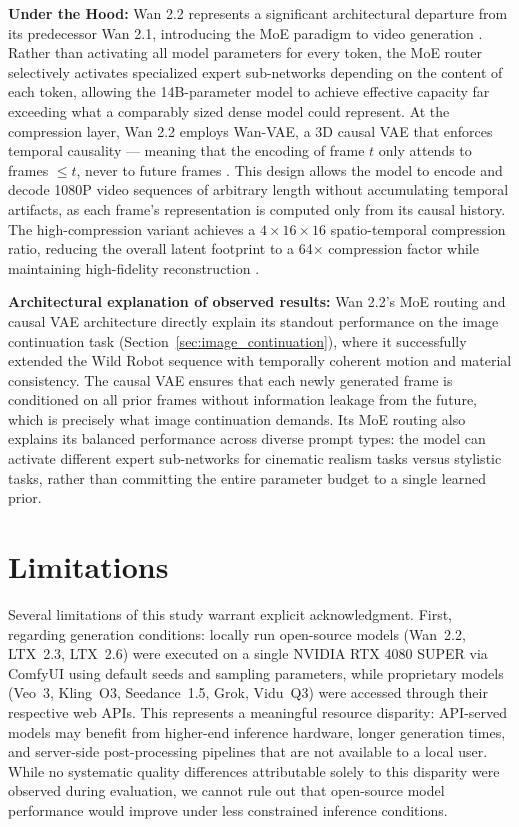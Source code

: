 \documentclass[sigconf]{acmart}
\begin{document}
\noindent\textbf{Under the Hood:} Wan 2.2 represents a significant
architectural departure from its predecessor Wan 2.1, introducing the
MoE paradigm to video generation \cite{alibaba2025wan}. Rather than
activating all model parameters for every token, the MoE router selectively activates specialized expert
sub-networks depending on the content of each token, allowing the
14B-parameter model to achieve effective capacity far exceeding what a
comparably sized dense model could represent. At the compression layer,
Wan 2.2 employs Wan-VAE, a 3D causal VAE that enforces temporal
causality — meaning that the encoding of frame $t$ only attends to
frames $\leq t$, never to future frames \cite{alibaba2025wan}. This
design allows the model to encode and decode 1080P video sequences of
arbitrary length without accumulating temporal artifacts, as each frame's
representation is computed only from its causal history. The high-compression
variant achieves a $4 \times 16 \times 16$ spatio-temporal compression
ratio, reducing the overall latent footprint to a 64$\times$ compression
factor while maintaining high-fidelity reconstruction \cite{alibaba2025wan}.

\noindent\textbf{Architectural explanation of observed results:} Wan 2.2's
MoE routing and causal VAE architecture directly explain its standout
performance on the image continuation task (Section~\ref{sec:image_continuation}),
where it successfully extended the Wild Robot sequence with temporally
coherent motion and material consistency. The causal VAE ensures that
each newly generated frame is conditioned on all prior frames without
information leakage from the future, which is precisely what image
continuation demands. Its MoE routing also explains its balanced
performance across diverse prompt types: the model can activate
different expert sub-networks for cinematic realism tasks versus
stylistic tasks, rather than committing the entire parameter budget to
a single learned prior.

\section{Limitations}
\label{sec:limitations}

Several limitations of this study warrant explicit acknowledgment. First,
regarding generation conditions: locally run open-source models (Wan~2.2,
LTX~2.3, LTX~2.6) were executed on a single NVIDIA RTX 4080 SUPER via
ComfyUI using default seeds and sampling parameters, while proprietary
models (Veo~3, Kling~O3, Seedance~1.5, Grok, Vidu~Q3) were accessed
through their respective web APIs. This represents a meaningful resource
disparity: API-served models may benefit from higher-end inference
hardware, longer generation times, and server-side post-processing
pipelines that are not available to a local user. While no systematic
quality differences attributable solely to this disparity were observed
during evaluation, we cannot rule out that open-source model performance
would improve under less constrained inference conditions.
\end{document}
